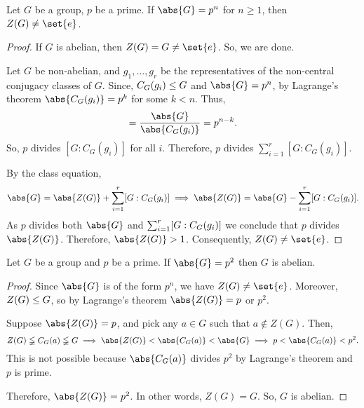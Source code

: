 \documentclass[11pt]{penrose}
\begin{document}
\begin{nthm}
    Let $G$ be a group, $p$ be a prime. If $\abs{G} = p^{n}$ for $n \geq 1$, then $Z(G) \neq \set{e}$.
\end{nthm}
\begin{proof}
    If $G$ is abelian, then $Z(G) = G \neq \set{e}$. So, we are done.

    Let $G$ be non-abelian, and $g_{1}, \dots, g_{r}$ be the representatives of the non-central conjugacy classes of $G$. Since, $C_{G}(g_{i}) \mathrel{\leq} G$ and $\abs{G} = p^{n}$, by Lagrange's theorem $\abs{C_{G}(g_{i})} = p^{k}$ for some $k < n$. Thus,
    \begin{equation*}
        [G : C_{G}(g_{i})] = \frac{\abs{G}}{\abs{C_{G}(g_{i})}} = p^{n-k}.
    \end{equation*}
    So, $p$ divides $[G : C_{G}(g_{i})]$ for all $i$. Therefore, $p$ divides $\sum_{i=1}^{r} [G : C_{G}(g_{i})]$.

    By the class equation,
    \begin{equation*}
        \abs{G} = \abs{Z(G)} + \sum_{i=1}^{r} \comm{G : C_{G}(g_{i})}
        \implies
        \abs{Z(G)} = \abs{G} - \sum_{i=1}^{r} \comm{G : C_{G}(g_{i})}.
    \end{equation*}
    As $p$ divides both $\abs{G}$ and $\sum_{i=1}^{r} \lbrack G : C_{G}(g_{i})\rbrack$ we conclude that $p$ divides $\abs{Z(G)}$. Therefore, $\abs{Z(G)} > 1$. Consequently, $Z(G) \neq \set{e}$.
\end{proof}

\begin{ncor}
    Let $G$ be a group and $p$ be a prime. If $\abs{G} = p^{2}$ then $G$ is abelian.
\end{ncor}
\begin{proof}
    Since $\abs{G}$ is of the form $p^{n}$, we have $Z(G) \neq \set{e}$. Moreover, $Z(G) \mathrel{\leq} G$, so by Lagrange's theorem $\abs{Z(G)} = p$ or $p^{2}$.

    Suppose $\abs{Z(G)} = p$, and pick any $a \in G$ such that $a \notin Z(G)$. Then,
    \begin{equation*}
        Z(G) \lneqq C_{G}(a) \lneqq G
        \implies
        \abs{Z(G)} < \abs{C_{G}(a)} < \abs{G}
        \implies
        p < \abs{C_{G}(a)} < p^{2}.
    \end{equation*}
    This is not possible because $\abs{C_{G}(a)}$ divides $p^{2}$ by Lagrange's theorem and $p$ is prime.

    Therefore, $\abs{Z(G)} = p^{2}$. In other words, $Z(G) = G$. So, $G$ is abelian.
\end{proof}
\end{document}
